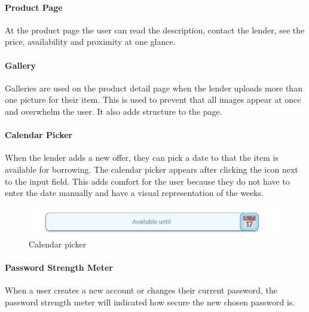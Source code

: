 	\paragraph{Product Page}
		At the product page the user can read the description, contact the lender, see the price, availability and proximity at one glance.
	\par
	
	\paragraph{Gallery}
		Galleries are used on the product detail page when the lender uploads more than one picture for their item. This is used to prevent that all images appear at once and overwhelm the user. It also adds structure to the page.
	\par
	
	\paragraph{Calendar Picker}
		When the lender adds a new offer, they can pick a date to that the item is available for borrowing. The calendar picker appears after clicking the icon next to the input field. This adds comfort for the user because they do not have to enter the date manually and have a visual representation of the weeks.
		
		\begin{figure}[H]
			\centering
			\includegraphics[width=\linewidth]{abb/3_design_guidelines/calendar_picker.png}
			\caption{Calendar picker}
			\label{fig:calendar_picker}
		\end{figure}
	\par
	
	\paragraph{Password Strength Meter}
		When a user creates a new account or changes their current password, the password strength meter will indicated how secure the new chosen password is.
	\par
	
